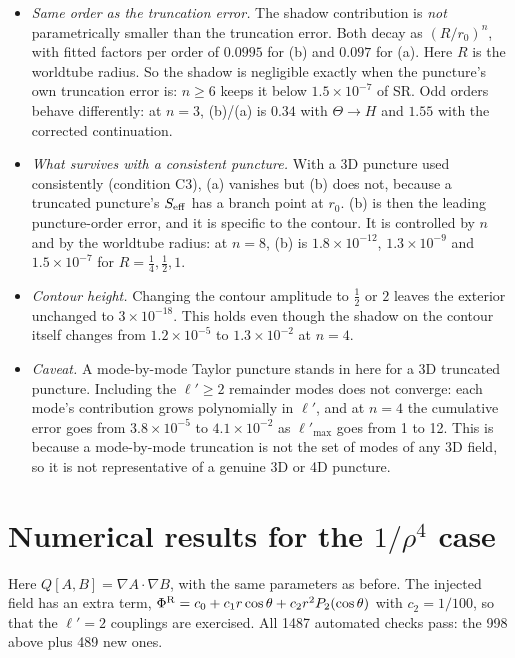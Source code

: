 \documentclass[11pt,a4paper]{article}
\newcommand{\PhiR}{\Phi^{\rm R}}
\begin{document}
\begin{itemize}[nosep]
\item \emph{Same order as the truncation error.}
  The shadow contribution is \emph{not} parametrically smaller than the truncation error.
  Both decay as $(R/r_0)^n$, with fitted factors per order of $0.0995$ for (b) and $0.097$ for (a).
  Here $R$ is the worldtube radius.
  So the shadow is negligible exactly when the puncture's own truncation error is: $n\ge6$ keeps it below $1.5\times10^{-7}$ of SR.
  Odd orders behave differently: at $n=3$, (b)/(a) is $0.34$ with $\Theta\to H$ and $1.55$ with the corrected continuation.
\item \emph{What survives with a consistent puncture.}
  With a 3D puncture used consistently (condition C3), (a) vanishes but (b) does not, because a truncated puncture's $S_{\rm eff}$ has a branch point at $r_0$.
  (b) is then the leading puncture-order error, and it is specific to the contour.
  It is controlled by $n$ and by the worldtube radius: at $n=8$, (b) is $1.8\times10^{-12}$, $1.3\times10^{-9}$ and $1.5\times10^{-7}$ for $R=\tfrac14,\tfrac12,1$.
\item \emph{Contour height.}
  Changing the contour amplitude to $\tfrac12$ or $2$ leaves the exterior unchanged to $3\times10^{-18}$.
  This holds even though the shadow on the contour itself changes from $1.2\times10^{-5}$ to $1.3\times10^{-2}$ at $n=4$.
\item \emph{Caveat.}
  A mode-by-mode Taylor puncture stands in here for a 3D truncated puncture.
  Including the $\ell'\ge2$ remainder modes does not converge: each mode's contribution grows polynomially in $\ell'$, and at $n=4$ the cumulative error goes from $3.8\times10^{-5}$ to $4.1\times10^{-2}$ as $\ell'_{\max}$ goes from 1 to 12.
  This is because a mode-by-mode truncation is not the set of modes of any 3D field, so it is not representative of a genuine 3D or 4D puncture.
\end{itemize}

\section{Numerical results for the \texorpdfstring{$1/\rho^4$}{1/rho\^4} case}\label{sec:numerics4}

Here $Q[A,B]=\nabla A\cdot\nabla B$, with the same parameters as before.
The injected field has an extra term, $\PhiR=c_0+c_1r\cos\theta+c_2r^2P_2(\cos\theta)$ with $c_2=1/100$, so that the $\ell'=2$ couplings are exercised.
All 1487 automated checks pass: the 998 above plus 489 new ones.
\end{document}
